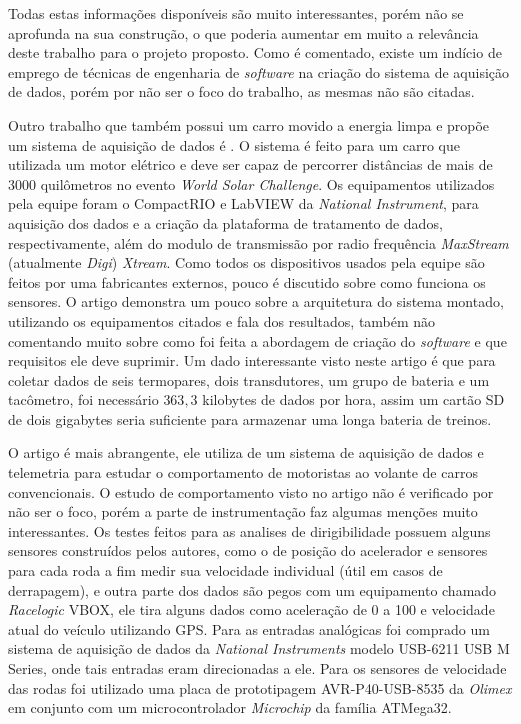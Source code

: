 Todas estas informações disponíveis são muito interessantes, porém \cite{gprsTelemetrySystem2013} não se aprofunda na sua construção, o que poderia aumentar em muito a relevância deste trabalho para o projeto proposto. Como é comentado, existe um indício de emprego de técnicas de engenharia de \textit{software} na criação do sistema de aquisição de dados, porém por não ser o foco do trabalho, as mesmas não são citadas. 

Outro trabalho que também possui um carro movido a energia limpa e propõe um sistema de aquisição de dados é \cite{applicationOfData2010}. O sistema é feito para um carro que utilizada um motor elétrico e deve ser capaz de percorrer distâncias de mais de 3000 quilômetros no evento \textit{World Solar Challenge}. Os equipamentos utilizados pela equipe foram o CompactRIO e LabVIEW da \textit{National Instrument}, para aquisição dos dados e a criação da plataforma de tratamento de dados, respectivamente, além do modulo de transmissão por radio frequência \textit{MaxStream} (atualmente \textit{Digi}) \textit{Xtream}. Como todos os dispositivos usados pela equipe são feitos por uma fabricantes externos, pouco é discutido sobre como funciona os sensores. O artigo demonstra um pouco sobre a arquitetura do sistema montado, utilizando os equipamentos citados e fala dos resultados, também não comentando muito sobre como foi feita a abordagem de criação do \textit{software} e que requisitos ele deve suprimir. Um dado interessante visto neste artigo é que para coletar dados de seis termopares, dois transdutores, um grupo de bateria e um tacômetro, foi necessário $363,3$ kilobytes de dados por hora, assim um cartão SD de dois gigabytes seria suficiente para armazenar uma longa bateria de treinos.

O artigo \cite{racecarInstrumentationFor2012} é mais abrangente, ele utiliza de um sistema de aquisição de dados e telemetria para estudar o comportamento de motoristas ao volante de carros convencionais. O estudo de comportamento visto no artigo não é verificado por não ser o foco, porém a parte de instrumentação faz algumas menções muito interessantes. Os testes feitos para as analises de dirigibilidade possuem alguns sensores construídos pelos autores, como o de posição do acelerador e sensores para cada roda a fim medir sua velocidade individual (útil em casos de derrapagem), e outra parte dos dados são pegos com um equipamento chamado \textit{Racelogic} VBOX, ele tira alguns dados como aceleração de 0 a 100 e velocidade atual do veículo utilizando GPS. Para as entradas analógicas foi comprado um sistema de aquisição de dados da \textit{National Instruments} modelo USB-6211 USB M Series, onde tais entradas eram direcionadas a ele. Para os sensores de velocidade das rodas foi utilizado uma placa de prototipagem AVR-P40-USB-8535 da \textit{Olimex} em conjunto com um microcontrolador \textit{Microchip} da família ATMega32.             


